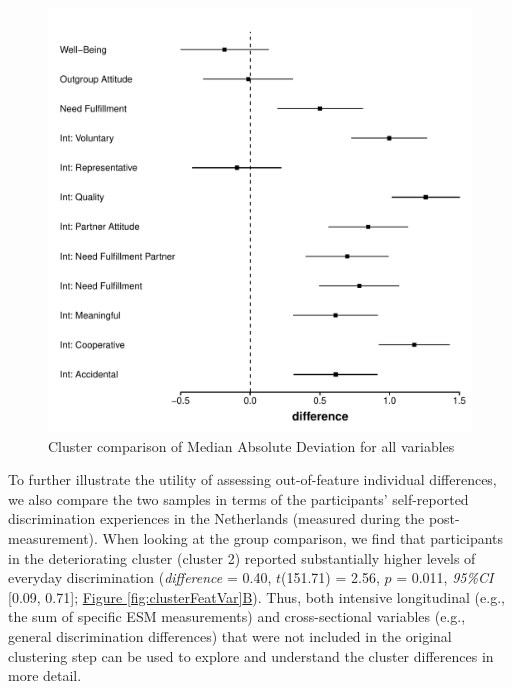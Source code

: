 \documentclass[man, 12pt, a4paper, floatsintext]{apa7}
\theoremstyle{break}
\theoremstyle{plain}
\newcommand{\fgrref}[2][]{\hyperref[#2]{Figure \ref*{#2}#1}}
\begin{document}
\begin{figure}[!ht] %
  \caption{Cluster comparison of Median Absolute Deviation for all variables}
  \label{fig:cluster_comparison_mad}
  \centering\includegraphics[width=\textwidth]{figures/feature_comparison_mad.pdf}
\end{figure}

To further illustrate the utility of assessing out-of-feature individual
differences, we also compare the two samples in terms of the
participants' self-reported discrimination experiences in the
Netherlands (measured during the post-measurement). When looking at the
group comparison, we find that participants in the deteriorating cluster
(cluster 2) reported substantially higher levels of everyday
discrimination (\textit{difference} = 0.40, \(t\)(151.71) = 2.56, \(p\)
= 0.011, \textit{95\%CI} {[}0.09, 0.71{]};
\fgrref[B]{fig:clusterFeatVar}). Thus, both intensive longitudinal
(e.g., the sum of specific ESM measurements) and cross-sectional
variables (e.g., general discrimination differences) that were not
included in the original clustering step can be used to explore and
understand the cluster differences in more detail.
\end{document}
